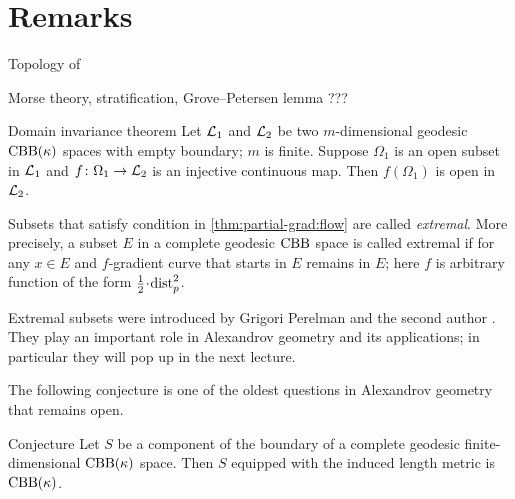 \section{Remarks}

Topology of 

Morse theory, stratification, Grove--Petersen lemma ???

\begin{thm}{Domain invariance theorem}
Let $\mathcal{L}_1$ and $\mathcal{L}_2$ be two $m$-dimensional geodesic $\mathrm{CBB}(\kappa)$ spaces with empty boundary; $m$ is finite.
Suppose $\Omega_1$ is an open subset in $\mathcal{L}_1$ and $f\colon\Omega_1\to \mathcal{L}_2$ is an injective continuous map.
Then $f(\Omega_1)$ is open in $\mathcal{L}_2$.
\end{thm}

Subsets that satisfy condition in \ref{thm:partial-grad:flow} are called \emph{extremal}.
More precisely, a subset $E$ in a complete geodesic $\mathrm{CBB}$ space is called extremal if for any $x\in E$
and $f$-gradient curve that starts in $E$ remains in $E$;
here $f$ is arbitrary function of the form $\tfrac12\cdot \distfun_p^2$.

Extremal subsets were introduced by Grigori Perelman and the second author \cite{perelman-petrunin}.
They play an important role in Alexandrov geometry and its applications;
in particular they will pop up in the next lecture.

The following conjecture is one of the oldest questions in Alexandrov geometry that remains open.

\begin{thm}{Conjecture}
Let $S$ be a component of the boundary of a complete geodesic finite-dimensional $\mathrm{CBB}(\kappa)$ space.
Then $S$ equipped with the induced length metric is $\mathrm{CBB}(\kappa)$.
\end{thm}



